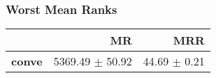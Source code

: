 \documentclass{article}
\begin{document}
    \subsubsection{Worst Mean Ranks}
    \begin{center}
    \begin{tabular}{lrr}
\toprule
{} &               MR &           MRR \\
\midrule
\textbf{conve} &  5369.49 $\pm$ 50.92 &  44.69 $\pm$ 0.21 \\
\bottomrule
\end{tabular}

    \end{center}
\end{document}

